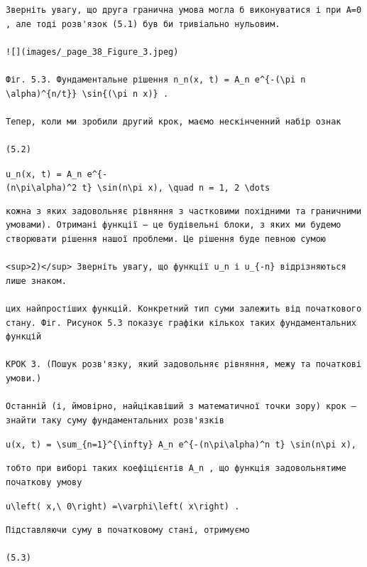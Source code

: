 \documentclass[
  ukrainian,
]{article}
\begin{document}
\begin{verbatim}
Зверніть увагу, що друга гранична умова могла б виконуватися і при A=0 , але тоді розв'язок (5.1) був би тривіально нульовим.

![](images/_page_38_Figure_3.jpeg)

Фіг. 5.3. Фундаментальне рішення n_n(x, t) = A_n e^{-(\pi n \alpha)^{n/t}} \sin{(\pi n x)} .

Тепер, коли ми зробили другий крок, маємо нескінченний набір ознак

(5.2)
\end{verbatim}

\texttt{u\_n(x,\ t)\ =\ A\_n\ e\^{}\{-(n\textbackslash{}pi\textbackslash{}alpha)\^{}2\ t\}\ \textbackslash{}sin(n\textbackslash{}pi\ x),\ \textbackslash{}quad\ n\ =\ 1,\ 2\ \textbackslash{}dots}

\begin{verbatim}
кожна з яких задовольняє рівняння з частковими похідними та граничними умовами). Отримані функції — це будівельні блоки, з яких ми будемо створювати рішення нашої проблеми. Це рішення буде певною сумою

<sup>2)</sup> Зверніть увагу, що функції u_n і u_{-n} відрізняються лише знаком.

цих найпростіших функцій. Конкретний тип суми залежить від початкового стану. Фіг. Рисунок 5.3 показує графіки кількох таких фундаментальних функцій

КРОК 3. (Пошук розв'язку, який задовольняє рівняння, межу та початкові умови.)

Останній (і, ймовірно, найцікавіший з математичної точки зору) крок — знайти таку суму фундаментальних розв'язків
\end{verbatim}

\texttt{u(x,\ t)\ =\ \textbackslash{}sum\_\{n=1\}\^{}\{\textbackslash{}infty\}\ A\_n\ e\^{}\{-(n\textbackslash{}pi\textbackslash{}alpha)\^{}n\ t\}\ \textbackslash{}sin(n\textbackslash{}pi\ x),}

\begin{verbatim}
тобто при виборі таких коефіцієнтів A_n , що функція задовольнятиме початкову умову
\end{verbatim}

\texttt{u\textbackslash{}left(\ x,\textbackslash{}\ 0\textbackslash{}right)\ =\textbackslash{}varphi\textbackslash{}left(\ x\textbackslash{}right)\ .}

\begin{verbatim}
Підставляючи суму в початковому стані, отримуємо

(5.3)
\end{verbatim}
\end{document}
